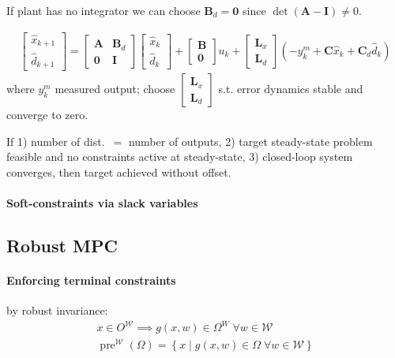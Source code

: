 \documentclass[landscape,a4paper,8pt]{scrartcl}
\newcommand{\mc}[1]{\mathcal{#1}}
\newcommand\vA{\bm{A}}
\newcommand\vB{\bm{B}}
\newcommand\vC{\bm{C}}
\newcommand\vI{\bm{I}}
\newcommand\vL{\bm{L}}
\newcommand{\Me}[1]{\begin{bmatrix}#1\end{bmatrix}} %
\DeclareMathOperator\pre{pre}
\begin{document}
\begin{multicols*}{3}
If plant has no integrator we can choose $\vB_d = \bm 0$ since $\det(\vA-\vI) \neq 0$.

\begin{align*}
\Me{\hat x_{k+1} \\ \hat d_{k+1}} = \Me{\vA & \vB_d \\ \bm 0 & \vI}\Me{\hat x_k \\ \hat d_k} + \Me{\vB \\ \bm 0}u_k + \Me{\vL_x \\ \vL_d}\left(-y_k^m + \vC\hat x_k + \vC_d \hat d_k\right)
\end{align*}
where $y_k^m$ measured output; choose $\Me{\vL_x \\ \vL_d}$ s.t. error dynamics stable and converge to zero.

If 1) number of dist.\ $=$ number of outputs, 2) target steady-state problem feasible and no constraints active at steady-state, 3) closed-loop system converges, then target achieved without offset.


\paragraph{Soft-constraints via slack variables}

\subsection{Robust MPC}
\paragraph{Enforcing terminal constraints} by robust invariance: \\
\begin{align*}
x \in O^{\mc W} \implies g(x, w) \in \Omega^W \; \forall w \in \mc W \\
\pre^{\mc W}(\Omega) = \left\{ x \middle| g(x, w) \in \Omega \; \forall w \in \mc W\right\}
\end{align*}


\end{multicols*}
\end{document}
